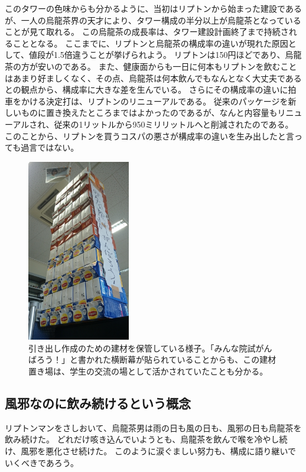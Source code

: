 このタワーの色味からも分かるように、当初はリプトンから始まった建設であるが、一人の烏龍茶界の天才により、タワー構成の半分以上が烏龍茶となっていることが見て取れる。
この烏龍茶の成長率は、タワー建設計画終了まで持続されることとなる。
ここまでに、リプトンと烏龍茶の構成率の違いが現れた原因として、値段が1.5倍違うことが挙げられよう。
リプトンは150円ほどであり、烏龍茶の方が安いのである。
また、健康面からも一日に何本もリプトンを飲むことはあまり好ましくなく、その点、烏龍茶は何本飲んでもなんとなく大丈夫であるとの観点から、構成率に大きな差を生んでいる。
さらにその構成率の違いに拍車をかける決定打は、リプトンのリニューアルである。
従来のパッケージを新しいものに置き換えたところまではよかったのであるが、なんと内容量もリニューアルされ、従来の1リットルから950ミリリットルへと削減されたのである。
このことから、リプトンを買うコスパの悪さが構成率の違いを生み出したと言っても過言ではない。


\begin{figure}[h]
\centering
\includegraphics[width=0.4\textwidth]{./section/Shokuji/figures/LiptonTower_tochuu.jpg}
  \caption{引き出し作成のための建材を保管している様子。「みんな院試がんばろう！」と書かれた横断幕が貼られていることからも、この建材置き場は、学生の交流の場として活かされていたことも分かる。}
\label{Fig:LiptonTower_tochuu}
\end{figure}

\subsection{風邪なのに飲み続けるという概念}
リプトンマンをさしおいて、烏龍茶男は雨の日も風の日も、風邪の日も烏龍茶を飲み続けた。
どれだけ咳き込んでいようとも、烏龍茶を飲んで喉を冷やし続け、風邪を悪化させ続けた。
このように涙ぐましい努力も、構成に語り継いでいくべきであろう。

